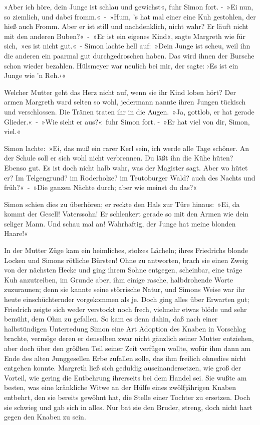 »Aber ich höre, dein Junge ist schlau und gewichst«, fuhr Simon fort. - »Ei nun, so ziemlich, und dabei fromm.« - »Hum, ’s hat mal einer eine Kuh gestohlen, der hieß auch Fromm. Aber er ist still und nachdenklich, nicht wahr? Er läuft nicht mit den anderen Buben?« - »Er ist ein eigenes Kind«, sagte Margreth wie für sich, »es ist nicht gut.« - Simon lachte hell auf: »Dein Junge ist scheu, weil ihn die anderen ein paarmal gut durchgedroschen haben. Das wird ihnen der Bursche schon wieder bezahlen. Hülsmeyer war neulich bei mir, der sagte: ›Es ist ein Junge wie ’n Reh.‹«

Welcher Mutter geht das Herz nicht auf, wenn sie ihr Kind loben hört? Der armen Margreth ward selten so wohl, jedermann nannte ihren Jungen tückisch und verschlossen. Die Tränen traten ihr in die Augen. »Ja, gottlob, er hat gerade Glieder.« - »Wie sieht er aus?« fuhr Simon fort. - »Er hat viel von dir, Simon, viel.«

Simon lachte: »Ei, das muß ein rarer Kerl sein, ich werde alle Tage schöner. An der Schule soll er sich wohl nicht verbrennen. Du läßt ihn die Kühe hüten? Ebenso gut. Es ist doch nicht halb wahr, was der Magister sagt. Aber wo hütet er? Im Telgengrund? im Roderholze? im Teutoburger Wald? auch des Nachts und früh?« - »Die ganzen Nächte durch; aber wie meinst du das?«

Simon schien dies zu überhören; er reckte den Hals zur Türe hinaus: »Ei, da kommt der Gesell! Vaterssohn! Er schlenkert gerade so mit den Armen wie dein seliger Mann. Und schau mal an! Wahrhaftig, der Junge hat meine blonden Haare!«

In der Mutter Züge kam ein heimliches, stolzes Lächeln; ihres Friedrichs blonde Locken und Simons rötliche Bürsten! Ohne zu antworten, brach sie einen Zweig von der nächsten Hecke und ging ihrem Sohne entgegen, scheinbar, eine träge Kuh anzutreiben, im Grunde aber, ihm einige rasche, halbdrohende Worte zuzuraunen; denn sie kannte seine störrische Natur, und Simons Weise war ihr heute einschüchternder vorgekommen als je. Doch ging alles über Erwarten gut; Friedrich zeigte sich weder verstockt noch frech, vielmehr etwas blöde und sehr bemüht, dem Ohm zu gefallen. So kam es denn dahin, daß nach einer halbstündigen Unterredung Simon eine Art Adoption des Knaben in Vorschlag brachte, vermöge deren er denselben zwar nicht gänzlich seiner Mutter entziehen, aber doch über den größten Teil seiner Zeit verfügen wollte, wofür ihm dann am Ende des alten Junggesellen Erbe zufallen solle, das ihm freilich ohnedies nicht entgehen konnte. Margreth ließ sich geduldig auseinandersetzen, wie groß der Vorteil, wie gering die Entbehrung ihrerseits bei dem Handel sei. Sie wußte am besten, was eine kränkliche Witwe an der Hülfe eines zwölfjährigen Knaben entbehrt, den sie bereits gewöhnt hat, die Stelle einer Tochter zu ersetzen. Doch sie schwieg und gab sich in alles. Nur bat sie den Bruder, streng, doch nicht hart gegen den Knaben zu sein.

